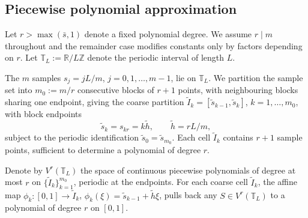 \documentclass[11pt]{article}
\begin{document}
\subsection{Piecewise polynomial approximation}\label{sec:polyapprox}


Let $r > \max(\bar{s}, 1)$ denote a fixed polynomial degree. We assume
$r \mid m$ throughout and  the remainder case modifies constants only by factors depending on $r$. Let $\mathbb{T}_L := \mathbb{R}/L\mathbb{Z}$ denote the periodic interval of length $L$.

The $m$ samples $s_j = jL/m$, $j = 0, 1, \ldots, m-1$, lie on
$\mathbb{T}_L$. We partition the sample set into $m_0 := m/r$
consecutive blocks of $r+1$ points, with neighbouring blocks sharing
one endpoint, giving the coarse partition
$\tilde{I}_k = [\tilde{s}_{k-1}, \tilde{s}_k]$, $k = 1, \ldots, m_0$,
with block endpoints
\begin{equation}\label{eq:cell_endpoints}
  \tilde{s}_k = s_{kr} = k\tilde{h},
  \qquad
  \tilde{h} = rL/m,
\end{equation}
subject to the periodic identification $\tilde{s}_0 = \tilde{s}_{m_0}$.
Each cell $\tilde{I}_k$ contains $r+1$ sample points, sufficient to
determine a polynomial of degree $r$.







Denote by $V^r(\mathbb{T}_L)$ the space of continuous piecewise
polynomials of degree at most $r$ on $\{\tilde{I}_k\}_{k=1}^{m_0}$,
periodic at the endpoints. For each coarse cell $\tilde{I}_k$, the
affine map $\phi_k\colon [0,1] \to \tilde{I}_k$,
$\phi_k(\xi) = \tilde{s}_{k-1} + \tilde{h}\xi$, pulls back any
$S \in V^r(\mathbb{T}_L)$ to a polynomial of degree $r$ on $[0,1]$.
\end{document}

